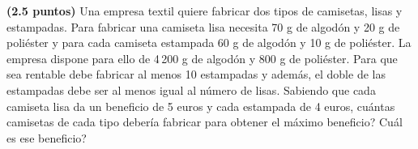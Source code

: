 
\textbf{(2.5 puntos)} Una empresa textil quiere fabricar dos tipos de camisetas,
lisas y estampadas. Para fabricar una camiseta lisa necesita 70 g de algodón
y 20 g de poliéster y para cada camiseta estampada 60 g de algodón y 10 g
de poliéster. La empresa dispone para ello de 4\,200 g de algodón y 800 g
de poliéster. Para que sea rentable debe fabricar al menos 10 estampadas
y además, el doble de las estampadas debe ser al menos igual al número
de lisas. Sabiendo que cada camiseta lisa da un beneficio de 5 euros y cada
estampada de 4 euros, \textquestiondown{}cuántas camisetas de cada tipo debería
fabricar para obtener el máximo beneficio? \textquestiondown{}Cuál es ese beneficio?
